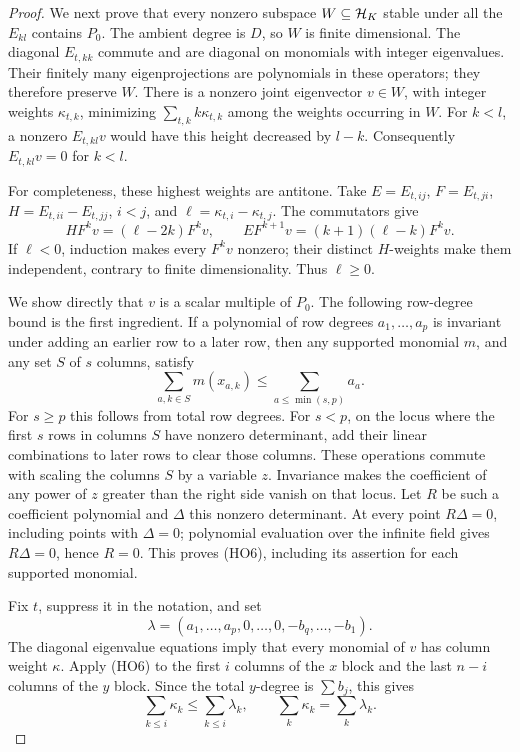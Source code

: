 \begin{proof}
We next prove that every nonzero subspace
\(W\subseteq{\cal H}_K\) stable under all the \(E_{kl}\)
contains \(P_0\).  The ambient degree is \(D\), so \(W\) is
finite dimensional.  The diagonal \(E_{t,kk}\) commute and
are diagonal on monomials with integer eigenvalues.
Their finitely many eigenprojections are polynomials in
these operators; they therefore preserve \(W\).
There is a nonzero joint eigenvector \(v\in W\), with
integer weights \(\kappa_{t,k}\), minimizing
\(\sum_{t,k}k\kappa_{t,k}\) among the weights occurring in
\(W\).  For \(k<l\), a nonzero \(E_{t,kl}v\) would have this
height decreased by \(l-k\).  Consequently
\(E_{t,kl}v=0\) for \(k<l\).

For completeness, these highest weights are antitone.
Take \(E=E_{t,ij}\), \(F=E_{t,ji}\),
\(H=E_{t,ii}-E_{t,jj}\), \(i<j\), and
\(\ell=\kappa_{t,i}-\kappa_{t,j}\).
The commutators give
\[
 H F^kv=(\ell-2k)F^kv,\qquad
 E F^{k+1}v=(k+1)(\ell-k)F^kv.
\]
If \(\ell<0\), induction makes every \(F^kv\) nonzero;
their distinct \(H\)-weights make them independent, contrary
to finite dimensionality.  Thus \(\ell\ge0\).

We show directly that \(v\) is a scalar multiple of \(P_0\).
The following row-degree bound is the first ingredient.
If a polynomial of row degrees \(a_1,\ldots,a_p\) is invariant
under adding an earlier row to a later row, then any supported
monomial \(m\), and any set \(S\) of \(s\) columns, satisfy
\[
 \sum_{a,k\in S}m(x_{a,k})\le\sum_{a\le\min(s,p)}a_a.
 \tag{HO6}\label{eq:sr-source-column-degree-dominance}
\]
For \(s\ge p\) this follows from total row degrees.
For \(s<p\), on the locus where the first \(s\) rows in
columns \(S\) have nonzero determinant, add their linear
combinations to later rows to clear those columns.
These operations commute with scaling the columns \(S\)
by a variable \(z\).  Invariance makes the coefficient of
any power of \(z\) greater than the right side vanish on
that locus.  Let \(R\) be such a coefficient polynomial and
\(\Delta\) this nonzero determinant.  At every point
\(R\Delta=0\), including points with \(\Delta=0\);
polynomial evaluation over the infinite field gives
\(R\Delta=0\), hence \(R=0\).
This proves (HO6), including its assertion for each supported
monomial.

Fix \(t\), suppress it in the notation, and set
\[
 \lambda=(a_1,\ldots,a_p,0,\ldots,0,-b_q,\ldots,-b_1).
\]
The diagonal eigenvalue equations imply that every monomial
of \(v\) has column weight \(\kappa\).
Apply (HO6) to the first \(i\) columns of the \(x\) block
and the last \(n-i\) columns of the \(y\) block.  Since the
total \(y\)-degree is \(\sum b_j\), this gives
\[
  \sum_{k\le i}\kappa_k\le\sum_{k\le i}\lambda_k,
       \qquad \sum_k\kappa_k=\sum_k\lambda_k.
 \tag{HO7}\label{eq:sr-source-prefix-weight-bound}
\]


\end{proof}
